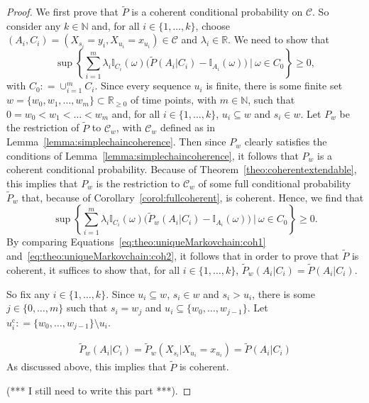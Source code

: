 \documentclass[10pt]{paper}
\theoremstyle{definition}
\newcommand{\nats}{\mathbb{N}}
\newcommand{\reals}{\mathbb{R}}
\newcommand{\ind}[1]{\mathbb{I}_{#1}}
\newcommand{\coloneqq}{:\!=}
\begin{document}
\begin{proof}
We first prove that $\tilde{P}$ is a coherent conditional probability on $\mathcal{C}$. So consider any $k\in\nats$ and, for all $i\in\{1,\dots,k\}$, choose $(A_i,C_i)=(X_{s_i}=y_i,X_{u_i}=x_{u_i})\in\mathcal{C}$ and $\lambda_i\in\reals$. We need to show that
\begin{equation}\label{eq:theo:uniqueMarkovchain:coh1}
\sup\left\{\sum_{i=1}^m\lambda_i\ind{C_i}(\omega)\bigl(\tilde{P}(A_i\vert C_i)-\ind{A_i}(\omega)\bigr)~\Bigg\vert~\omega\in C_0\right\}\geq0,
\end{equation}
with $C_0\coloneqq\cup_{i=1}^mC_i$.
Since every sequence $u_i$ is finite, there is some finite set $w=\{w_0,w_1,\dots,w_m\}\subset\reals_{\geq0}$ of time points, with $m\in\nats$, such that $0=w_0<w_1<\dots<w_m$ and, for all $i\in\{1,\dots,k\}$, $u_i\subseteq w$ and $s_i\in w$.
Let $P_w$ be the restriction of $\tilde{P}$ to $\mathcal{C}_w$, with $\mathcal{C}_w$ defined as in Lemma~\ref{lemma:simplechaincoherence}. Then since $P_w$ clearly satisfies the conditions of Lemma~\ref{lemma:simplechaincoherence}, it follows that $P_w$ is a coherent conditional probability. Because of Theorem~\ref{theo:coherentextendable}, this implies that $P_w$ is the restriction to $\mathcal{C}_w$ of some full conditional probability $\tilde{P}_w$ that, because of Corollary~\ref{corol:fullcoherent}, is coherent. Hence, we find that
\begin{equation}\label{eq:theo:uniqueMarkovchain:coh2}
\sup\left\{\sum_{i=1}^m\lambda_i\ind{C_i}(\omega)\bigl(\tilde{P}_w(A_i\vert C_i)-\ind{A_i}(\omega)\bigr)~\Bigg\vert~\omega\in C_0\right\}\geq0.
\end{equation}
By comparing Equations~\eqref{eq:theo:uniqueMarkovchain:coh1} and~\eqref{eq:theo:uniqueMarkovchain:coh2}, it follows that in order to prove that $\tilde{P}$ is coherent, it suffices to show that, for all $i\in\{1,\dots,k\}$, $\tilde{P}_w(A_i\vert C_i)=\tilde{P}(A_i\vert C_i)$.

So fix any $i\in\{1,\dots,k\}$. Since $u_i\subseteq w$, $s_i\in w$ and $s_i>u_i$, there is some $j\in\{0,\dots,m\}$ such that $s_i=w_j$ and $u_i\subseteq\{w_0,\dots,w_{j-1}\}$. Let $u_i^\mathrm{c}\coloneqq\{w_0,\dots,w_{j-1}\}\setminus u_i$.

\begin{align*}
\tilde{P}_w(A_i\vert C_i)
=\tilde{P}_w(X_{s_i}\vert X_{u_i}=x_{u_i})
=\tilde{P}(A_i\vert C_i)
\end{align*}
As discussed above, this implies that $\tilde{P}$ is coherent.

 (*** I still need to write this part ***).


\end{proof}
\end{document}
